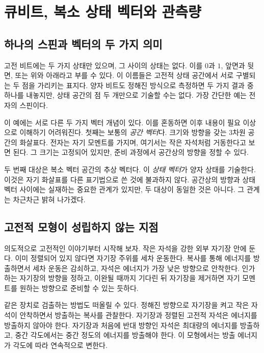 \chapter{큐비트, 복소 상태 벡터와 관측량}


\section{하나의 스핀과 벡터의 두 가지 의미}

고전 비트에는 두 가지 상태만 있으며, 그 사이의 상태는 없다. 이를 \(0\)과 \(1\), 앞면과 뒷면, 또는 위와 아래라고 부를 수 있다. 이 이름들은 고전적 상태 공간에서 서로 구별되는 두 점을 가리키는 표지다. 양자 비트도 정해진 방식으로 측정하면 두 가지 결과 중 하나를 내놓지만, 상태 공간의 점 두 개만으로 기술할 수는 없다. 가장 간단한 예는 전자의 스핀이다.

이 예에는 서로 다른 두 가지 벡터 개념이 있다. 이를 혼동하면 이후 내용이 필요 이상으로 이해하기 어려워진다. 첫째는 보통의 \emph{공간 벡터}다. 크기와 방향을 갖는 3차원 공간의 화살표다. 전자는 자기 모멘트를 가지며, 여기서는 작은 자석처럼 거동한다고 보면 된다. 그 크기는 고정되어 있지만, 준비 과정에서 공간상의 방향을 정할 수 있다.

두 번째 대상은 복소 벡터 공간의 추상 벡터다. 이 \emph{상태 벡터}가 양자 상태를 기술한다. 이것은 자기 화살표를 다른 표기법으로 쓴 것에 불과하지 않다. 공간상의 방향과 상태 벡터 사이에는 실재하는 중요한 관계가 있지만, 두 대상이 동일한 것은 아니다. 그 관계는 차근차근 밝혀 나가겠다.

\section{고전적 모형이 성립하지 않는 지점}

의도적으로 고전적인 이야기부터 시작해 보자. 작은 자석을 강한 외부 자기장 안에 둔다. 이미 정렬되어 있지 않다면 자기장 주위를 세차 운동한다. 복사를 통해 에너지를 방출하면서 세차 운동은 감쇠하고, 자석은 에너지가 가장 낮은 방향으로 안착한다. 인가하는 자기장의 방향을 정하고, 이완될 때까지 기다린 뒤 자기장을 제거하면 자기 모멘트를 원하는 방향으로 준비할 수 있는 듯하다.

같은 장치로 검출하는 방법도 떠올릴 수 있다. 정해진 방향으로 자기장을 켜고 작은 자석이 안착하면서 방출하는 복사를 관찰한다. 자기장과 정렬된 고전적 자석은 에너지를 방출하지 않아야 한다. 자기장과 처음에 반대 방향인 자석은 최대량의 에너지를 방출하고, 중간 각도에서는 중간 정도의 에너지를 방출해야 한다. 이 모형에서는 방출 에너지가 각도에 따라 연속적으로 변한다.

